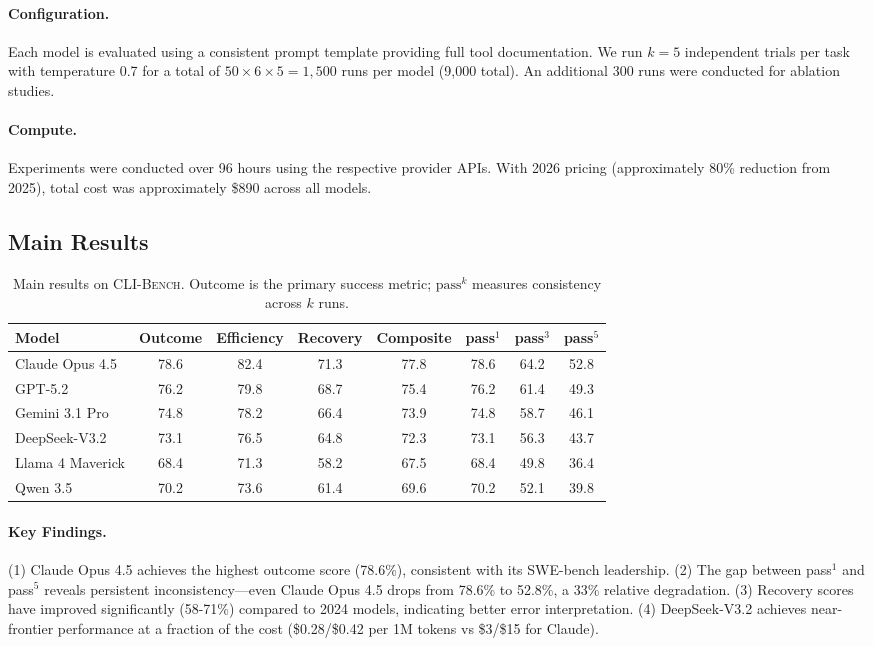 \documentclass{article}
\newcommand{\clibench}{\textsc{CLI-Bench}}
\begin{document}
\paragraph{Configuration.} Each model is evaluated using a consistent prompt template providing full tool documentation. We run $k=5$ independent trials per task with temperature 0.7 for a total of $50 \times 6 \times 5 = 1,500$ runs per model (9,000 total). An additional 300 runs were conducted for ablation studies.

\paragraph{Compute.} Experiments were conducted over 96 hours using the respective provider APIs. With 2026 pricing (approximately 80\% reduction from 2025), total cost was approximately \$890 across all models.

\subsection{Main Results}

\begin{table}[h]
\centering
\caption{Main results on \clibench{}. Outcome is the primary success metric; $\text{pass}^k$ measures consistency across $k$ runs.}
\label{tab:main-results}
\begin{tabular}{lccccccc}
\toprule
\textbf{Model} & \textbf{Outcome} & \textbf{Efficiency} & \textbf{Recovery} & \textbf{Composite} & \textbf{pass$^1$} & \textbf{pass$^3$} & \textbf{pass$^5$} \\
\midrule
Claude Opus 4.5 & 78.6 & 82.4 & 71.3 & 77.8 & 78.6 & 64.2 & 52.8 \\
GPT-5.2 & 76.2 & 79.8 & 68.7 & 75.4 & 76.2 & 61.4 & 49.3 \\
Gemini 3.1 Pro & 74.8 & 78.2 & 66.4 & 73.9 & 74.8 & 58.7 & 46.1 \\
DeepSeek-V3.2 & 73.1 & 76.5 & 64.8 & 72.3 & 73.1 & 56.3 & 43.7 \\
Llama 4 Maverick & 68.4 & 71.3 & 58.2 & 67.5 & 68.4 & 49.8 & 36.4 \\
Qwen 3.5 & 70.2 & 73.6 & 61.4 & 69.6 & 70.2 & 52.1 & 39.8 \\
\bottomrule
\end{tabular}
\end{table}

\paragraph{Key Findings.} (1) Claude Opus 4.5 achieves the highest outcome score (78.6\%), consistent with its SWE-bench leadership. (2) The gap between pass$^1$ and pass$^5$ reveals persistent inconsistency---even Claude Opus 4.5 drops from 78.6\% to 52.8\%, a 33\% relative degradation. (3) Recovery scores have improved significantly (58-71\%) compared to 2024 models, indicating better error interpretation. (4) DeepSeek-V3.2 achieves near-frontier performance at a fraction of the cost (\$0.28/\$0.42 per 1M tokens vs \$3/\$15 for Claude).
\end{document}
